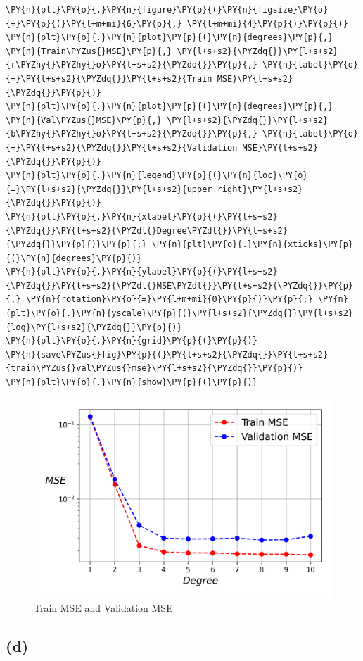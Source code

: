 \documentclass[a4paper,11pt]{article}%
\begin{document}
\begin{tcolorbox}[breakable, size=fbox, boxrule=1pt, pad at break*=1mm,colback=cellbackground, colframe=cellborder]
\begin{Verbatim}[commandchars=\\\{\}]
\PY{n}{plt}\PY{o}{.}\PY{n}{figure}\PY{p}{(}\PY{n}{figsize}\PY{o}{=}\PY{p}{(}\PY{l+m+mi}{6}\PY{p}{,} \PY{l+m+mi}{4}\PY{p}{)}\PY{p}{)}
\PY{n}{plt}\PY{o}{.}\PY{n}{plot}\PY{p}{(}\PY{n}{degrees}\PY{p}{,} \PY{n}{Train\PYZus{}MSE}\PY{p}{,} \PY{l+s+s2}{\PYZdq{}}\PY{l+s+s2}{r\PYZhy{}\PYZhy{}o}\PY{l+s+s2}{\PYZdq{}}\PY{p}{,} \PY{n}{label}\PY{o}{=}\PY{l+s+s2}{\PYZdq{}}\PY{l+s+s2}{Train MSE}\PY{l+s+s2}{\PYZdq{}}\PY{p}{)}
\PY{n}{plt}\PY{o}{.}\PY{n}{plot}\PY{p}{(}\PY{n}{degrees}\PY{p}{,} \PY{n}{Val\PYZus{}MSE}\PY{p}{,} \PY{l+s+s2}{\PYZdq{}}\PY{l+s+s2}{b\PYZhy{}\PYZhy{}o}\PY{l+s+s2}{\PYZdq{}}\PY{p}{,} \PY{n}{label}\PY{o}{=}\PY{l+s+s2}{\PYZdq{}}\PY{l+s+s2}{Validation MSE}\PY{l+s+s2}{\PYZdq{}}\PY{p}{)}
\PY{n}{plt}\PY{o}{.}\PY{n}{legend}\PY{p}{(}\PY{n}{loc}\PY{o}{=}\PY{l+s+s2}{\PYZdq{}}\PY{l+s+s2}{upper right}\PY{l+s+s2}{\PYZdq{}}\PY{p}{)}
\PY{n}{plt}\PY{o}{.}\PY{n}{xlabel}\PY{p}{(}\PY{l+s+s2}{\PYZdq{}}\PY{l+s+s2}{\PYZdl{}Degree\PYZdl{}}\PY{l+s+s2}{\PYZdq{}}\PY{p}{)}\PY{p}{;} \PY{n}{plt}\PY{o}{.}\PY{n}{xticks}\PY{p}{(}\PY{n}{degrees}\PY{p}{)}
\PY{n}{plt}\PY{o}{.}\PY{n}{ylabel}\PY{p}{(}\PY{l+s+s2}{\PYZdq{}}\PY{l+s+s2}{\PYZdl{}MSE\PYZdl{}}\PY{l+s+s2}{\PYZdq{}}\PY{p}{,} \PY{n}{rotation}\PY{o}{=}\PY{l+m+mi}{0}\PY{p}{)}\PY{p}{;} \PY{n}{plt}\PY{o}{.}\PY{n}{yscale}\PY{p}{(}\PY{l+s+s2}{\PYZdq{}}\PY{l+s+s2}{log}\PY{l+s+s2}{\PYZdq{}}\PY{p}{)}
\PY{n}{plt}\PY{o}{.}\PY{n}{grid}\PY{p}{(}\PY{p}{)}
\PY{n}{save\PYZus{}fig}\PY{p}{(}\PY{l+s+s2}{\PYZdq{}}\PY{l+s+s2}{train\PYZus{}val\PYZus{}mse}\PY{l+s+s2}{\PYZdq{}}\PY{p}{)}
\PY{n}{plt}\PY{o}{.}\PY{n}{show}\PY{p}{(}\PY{p}{)}
\end{Verbatim}
\end{tcolorbox}

\begin{figure}[h]
	\centering
	\includegraphics[width=0.7\linewidth]{figures/train_val_mse}
	\caption{Train MSE and Validation MSE}
\end{figure}
    
    \hypertarget{d}{%
\subsection{(d)}\label{d}}
\end{document}
